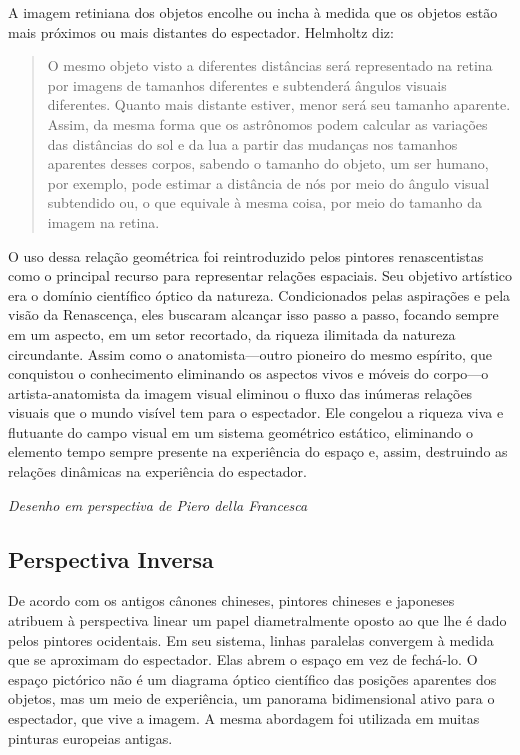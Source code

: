 \documentclass[a4paper]{article}
\begin{document}
A imagem retiniana dos objetos encolhe ou incha à medida que os objetos estão mais próximos ou mais distantes do espectador. Helmholtz diz:
\begin{quote}
O mesmo objeto visto a diferentes distâncias será representado na retina por imagens de tamanhos diferentes e subtenderá ângulos visuais diferentes. Quanto mais distante estiver, menor será seu tamanho aparente. Assim, da mesma forma que os astrônomos podem calcular as variações das distâncias do sol e da lua a partir das mudanças nos tamanhos aparentes desses corpos, sabendo o tamanho do objeto, um ser humano, por exemplo, pode estimar a distância de nós por meio do ângulo visual subtendido ou, o que equivale à mesma coisa, por meio do tamanho da imagem na retina.
\end{quote}

O uso dessa relação geométrica foi reintroduzido pelos pintores renascentistas como o principal recurso para representar relações espaciais. Seu objetivo artístico era o domínio científico óptico da natureza. Condicionados pelas aspirações e pela visão da Renascença, eles buscaram alcançar isso passo a passo, focando sempre em um aspecto, em um setor recortado, da riqueza ilimitada da natureza circundante. Assim como o anatomista---outro pioneiro do mesmo espírito, que conquistou o conhecimento eliminando os aspectos vivos e móveis do corpo---o artista-anatomista da imagem visual eliminou o fluxo das inúmeras relações visuais que o mundo visível tem para o espectador. Ele congelou a riqueza viva e flutuante do campo visual em um sistema geométrico estático, eliminando o elemento tempo sempre presente na experiência do espaço e, assim, destruindo as relações dinâmicas na experiência do espectador.

\medskip
\noindent\textit{Desenho em perspectiva de Piero della Francesca}

\subsection*{Perspectiva Inversa}

De acordo com os antigos cânones chineses, pintores chineses e japoneses atribuem à perspectiva linear um papel diametralmente oposto ao que lhe é dado pelos pintores ocidentais. Em seu sistema, linhas paralelas convergem à medida que se aproximam do espectador. Elas abrem o espaço em vez de fechá-lo. O espaço pictórico não é um diagrama óptico científico das posições aparentes dos objetos, mas um meio de experiência, um panorama bidimensional ativo para o espectador, que vive a imagem. A mesma abordagem foi utilizada em muitas pinturas europeias antigas.
\end{document}
